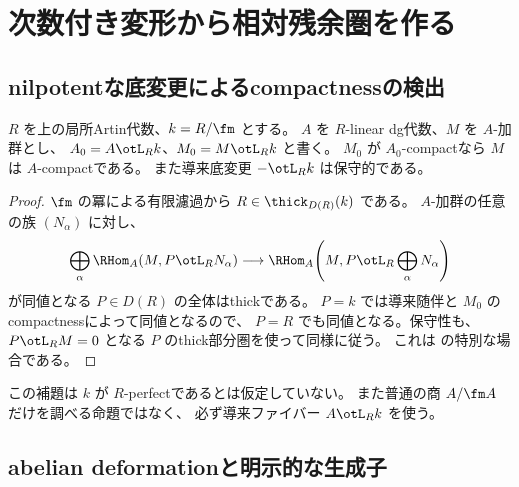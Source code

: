 \section{次数付き変形から相対残余圏を作る}\label{sec:relative}

\subsection{nilpotentな底変更によるcompactnessの検出}

\begin{lemma}\label{lem:descent}
 \(R\) を上の局所Artin代数、\(k=R/\fm\) とする。
 \(A\) を \(R\)-linear dg代数、\(M\) を \(A\)-加群とし、
 \(A_0=A\otL_R k\)、\(M_0=M\otL_R k\) と書く。
 \(M_0\) が \(A_0\)-compactなら \(M\) は \(A\)-compactである。
 また導来底変更 \(-\otL_R k\) は保守的である。
\end{lemma}
\begin{proof}
 \(\fm\) の冪による有限濾過から
 \(R\in\thick_{D(R)}(k)\) である。
 \(A\)-加群の任意の族 \((N_\alpha)\) に対し、
 \[
 \bigoplus_\alpha\RHom_A(M,P\otL_RN_\alpha)
 \longrightarrow
 \RHom_A\!\left(M,P\otL_R\bigoplus_\alpha N_\alpha\right)
 \]
 が同値となる \(P\in D(R)\) の全体はthickである。
 \(P=k\) では導来随伴と \(M_0\) のcompactnessによって同値となるので、
 \(P=R\) でも同値となる。保守性も、
 \(P\otL_RM=0\) となる \(P\) のthick部分圏を使って同様に従う。
 これは \cite[Propositions 3.28, 3.35; Remark 3.29]{Mathew}
 の特別な場合である。
\end{proof}

\begin{remark}
 この補題は \(k\) が \(R\)-perfectであるとは仮定していない。
 また普通の商 \(A/\fm A\) だけを調べる命題ではなく、
 必ず導来ファイバー \(A\otL_Rk\) を使う。
\end{remark}

\subsection{abelian deformationと明示的な生成子}


